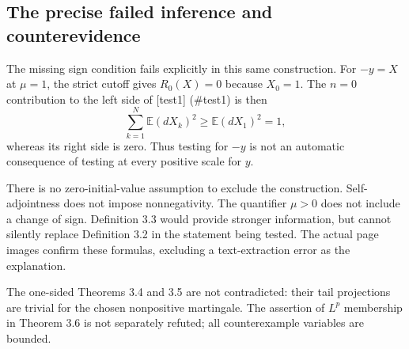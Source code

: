 \documentclass[10pt]{article}
\begin{document}
\subsection*{The precise failed inference and counterevidence}
The missing sign condition fails explicitly in this same construction. For \(-y=X\) at \(\mu=1\), the strict cutoff gives \(R_0(X)=0\) because \(X_0=1\). The \(n=0\) contribution to the left side of [test1] (\#test1) is then \[\sum_{k=1}^{N}\mathbb E(dX_k)^2\ge \mathbb E(dX_1)^2=1,\] whereas its right side is zero. Thus testing for \(-y\) is not an automatic consequence of testing at every positive scale for \(y\).\par
There is no zero-initial-value assumption to exclude the construction. Self-adjointness does not impose nonnegativity. The quantifier \(\mu>0\) does not include a change of sign. Definition 3.3 would provide stronger information, but cannot silently replace Definition 3.2 in the statement being tested. The actual page images confirm these formulas, excluding a text-extraction error as the explanation.\par
The one-sided Theorems 3.4 and 3.5 are not contradicted: their tail projections are trivial for the chosen nonpositive martingale. The assertion of \(L^p\) membership in Theorem 3.6 is not separately refuted; all counterexample variables are bounded.\par
\end{document}
